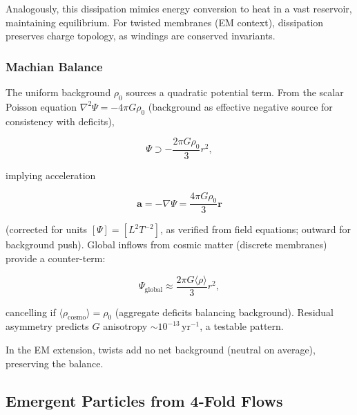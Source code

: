 Analogously, this dissipation mimics energy conversion to heat in a vast reservoir, maintaining equilibrium. For twisted membranes (EM context), dissipation preserves charge topology, as windings are conserved invariants.

\subsubsection{Machian Balance}
The uniform background $\rho_0$ sources a quadratic potential term. From the scalar Poisson equation $\nabla^2 \Psi = -4\pi G \rho_0$ (background as effective negative source for consistency with deficits),

\begin{equation}
\Psi \supset -\frac{2\pi G \rho_0}{3} r^2,
\end{equation}

implying acceleration

\begin{equation}
\mathbf{a} = -\nabla \Psi = \frac{4\pi G \rho_0}{3} \mathbf{r}
\end{equation}

(corrected for units $[\Psi] = [L^2 T^{-2}]$, as verified from field equations; outward for background push). Global inflows from cosmic matter (discrete membranes) provide a counter-term:

\begin{equation}
\Psi_{\text{global}} \approx \frac{2\pi G \langle \rho \rangle}{3} r^2,
\end{equation}

cancelling if $\langle \rho_\text{cosmo} \rangle = \rho_0$ (aggregate deficits balancing background). Residual asymmetry predicts $G$ anisotropy $\sim 10^{-13} \,\mathrm{yr}^{-1}$, a testable pattern.

In the EM extension, twists add no net background (neutral on average), preserving the balance.

\medskip
\noindent
{}
\medskip

\subsection{Emergent Particles from 4-Fold Flows}

